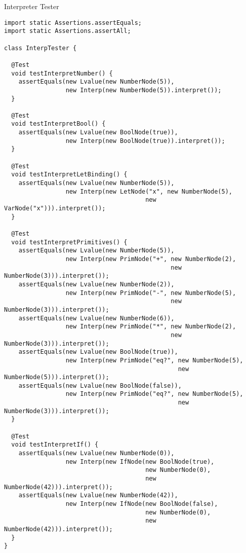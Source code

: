\begin{cl}{Interpreter Tester}
\begin{lstlisting}[language=MyJava]
import static Assertions.assertEquals;
import static Assertions.assertAll;

class InterpTester {
  
  @Test
  void testInterpretNumber() {
    assertEquals(new Lvalue(new NumberNode(5)), 
                 new Interp(new NumberNode(5)).interpret());
  }

  @Test
  void testInterpretBool() {
    assertEquals(new Lvalue(new BoolNode(true)), 
                 new Interp(new BoolNode(true)).interpret());
  }

  @Test
  void testInterpretLetBinding() { 
    assertEquals(new Lvalue(new NumberNode(5)), 
                 new Interp(new LetNode("x", new NumberNode(5), 
                                       new VarNode("x"))).interpret());
  }

  @Test 
  void testInterpretPrimitives() {
    assertEquals(new Lvalue(new NumberNode(5)), 
                 new Interp(new PrimNode("+", new NumberNode(2), 
                                              new NumberNode(3))).interpret());
    assertEquals(new Lvalue(new NumberNode(2)), 
                 new Interp(new PrimNode("-", new NumberNode(5), 
                                              new NumberNode(3))).interpret());
    assertEquals(new Lvalue(new NumberNode(6)), 
                 new Interp(new PrimNode("*", new NumberNode(2), 
                                              new NumberNode(3))).interpret());
    assertEquals(new Lvalue(new BoolNode(true)), 
                 new Interp(new PrimNode("eq?", new NumberNode(5), 
                                                new NumberNode(5))).interpret());
    assertEquals(new Lvalue(new BoolNode(false)), 
                 new Interp(new PrimNode("eq?", new NumberNode(5), 
                                                new NumberNode(3))).interpret());
  }

  @Test
  void testInterpretIf() {
    assertEquals(new Lvalue(new NumberNode(0)), 
                 new Interp(new IfNode(new BoolNode(true), 
                                       new NumberNode(0), 
                                       new NumberNode(42))).interpret());
    assertEquals(new Lvalue(new NumberNode(42)), 
                 new Interp(new IfNode(new BoolNode(false), 
                                       new NumberNode(0), 
                                       new NumberNode(42))).interpret());
  }
}
\end{lstlisting}
\end{cl}

